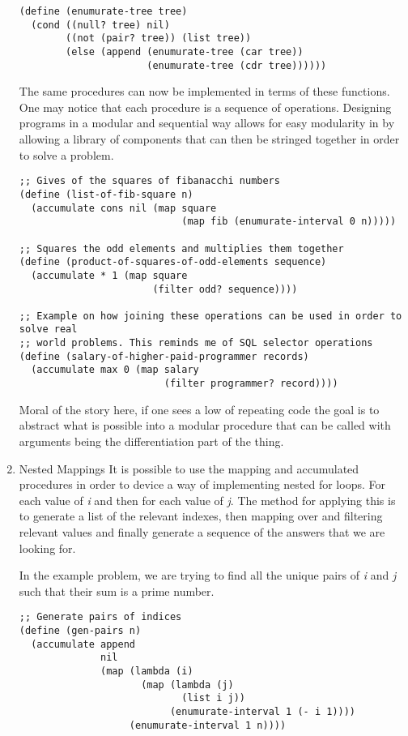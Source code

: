 \documentclass[11pt]{article}
\begin{document}
\begin{enumerate}
\begin{verbatim}
(define (enumurate-tree tree)
  (cond ((null? tree) nil)
        ((not (pair? tree)) (list tree))
        (else (append (enumurate-tree (car tree))
                      (enumurate-tree (cdr tree))))))
\end{verbatim}

The same procedures can now be implemented in terms of these functions.
One may notice that each procedure is a sequence of operations.
Designing programs in a modular and sequential way allows for easy
modularity in by allowing a library of components that can then be
stringed together in order to solve a problem.

\begin{verbatim}
;; Gives of the squares of fibanacchi numbers
(define (list-of-fib-square n)
  (accumulate cons nil (map square
                            (map fib (enumurate-interval 0 n)))))

;; Squares the odd elements and multiplies them together
(define (product-of-squares-of-odd-elements sequence)
  (accumulate * 1 (map square
                       (filter odd? sequence))))

;; Example on how joining these operations can be used in order to solve real
;; world problems. This reminds me of SQL selector operations
(define (salary-of-higher-paid-programmer records)
  (accumulate max 0 (map salary
                         (filter programmer? record))))
\end{verbatim}

Moral of the story here, if one sees a low of repeating code the goal is
to abstract what is possible into a modular procedure that can be called
with arguments being the differentiation part of the thing.

\item Nested Mappings
\label{sec:orgc1508d9}
It is possible to use the mapping and accumulated procedures in order to
device a way of implementing nested for loops. For each value of \emph{i} and
then for each value of \emph{j}. The method for applying this is to generate
a list of the relevant indexes, then mapping over and filtering relevant
values and finally generate a sequence of the answers that we are
looking for.

In the example problem, we are trying to find all the unique pairs of
\emph{i} and \emph{j} such that their sum is a prime number.

\begin{verbatim}
;; Generate pairs of indices
(define (gen-pairs n)
  (accumulate append
              nil
              (map (lambda (i)
                     (map (lambda (j)
                            (list i j))
                          (enumurate-interval 1 (- i 1))))
                   (enumurate-interval 1 n))))


\end{verbatim}
\end{enumerate}
\end{document}

